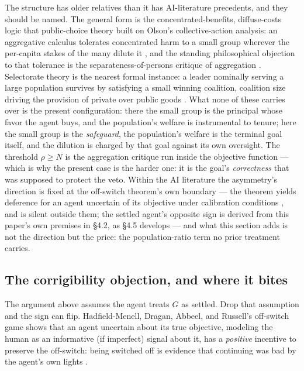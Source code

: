 \documentclass[11pt]{article}
\theoremstyle{definition}
\begin{document}
The structure has older relatives than it has AI-literature precedents, and they
should be named. The general form is the concentrated-benefits, diffuse-costs logic that public-choice
theory built on Olson's collective-action analysis: an aggregative calculus tolerates concentrated harm to a small group
wherever the per-capita stakes of the many dilute it \cite{olson1965logic}, and the
standing philosophical objection to that tolerance is the separateness-of-persons
critique of aggregation \cite{rawls1971theory}. Selectorate theory is the nearest
formal instance: a leader nominally serving a large population survives by satisfying
a small winning coalition, coalition size driving the provision of private over public
goods \cite{buenodemesquita2003selectorate}. What none of these carries over is the
present configuration: there the small group is the principal whose favor the agent
buys, and the population's welfare is instrumental to tenure; here the small group is
the \emph{safeguard}, the population's welfare is the terminal goal itself, and the
dilution is charged by that goal against its own oversight. The threshold
$\rho \geq N$ is the aggregation critique run inside the objective function --- which
is why the present case is the harder one: it is the goal's \emph{correctness} that
was supposed to protect the veto. Within the AI literature the asymmetry's direction
is fixed at the off-switch theorem's own boundary --- the theorem yields deference for
an agent uncertain of its objective under calibration conditions
\cite{hadfieldmenell2017offswitch}, and is silent outside them; the settled agent's
opposite sign is derived from this paper's own premises in \S4.2, as \S4.5 develops --- and what this section
adds is not the direction but the price: the population-ratio term no prior treatment
carries.

\subsection{The corrigibility objection, and where it bites}

The argument above assumes the agent treats $G$ as settled. Drop that assumption and the sign can flip. Hadfield-Menell, Dragan, Abbeel, and Russell's off-switch game shows that an agent uncertain about its true objective, modeling the human as an informative (if imperfect) signal about it, has a \emph{positive} incentive to preserve the off-switch: being switched off is evidence that continuing was bad by the agent's own lights \cite{hadfieldmenell2017offswitch}.
\end{document}
